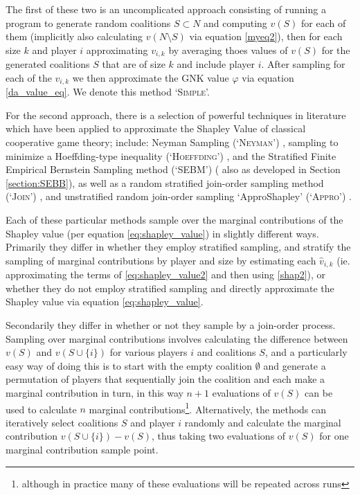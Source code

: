 The first of these two is an uncomplicated approach consisting of running a program to generate random coalitions $S\subset N$ and computing $v(S)$ for each of them (implicitly also calculating $v(N\setminus S)$ via equation \ref{myeq2}), then for each size $k$ and player $i$ approximating $v_{i,k}$ by averaging thoes values of $v(S)$ for the generated coalitions $S$ that are of size $k$ and include player $i$.
After sampling for each of the $v_{i,k}$ we then approximate the GNK value $\varphi$ via equation \ref{da_value_eq}. We denote this method `\textsc{Simple}'.

For the second approach, there is a selection of powerful techniques in literature which have been applied to approximate the Shapley Value of classical cooperative game theory; include: Neyman Sampling (`\textsc{Neyman}') \cite{CASTRO2017180,1938.10503378}, sampling to minimize a Hoeffding-type inequality (`\textsc{Hoeffding}') \cite{2013arXiv1306.4265M}, and the Stratified Finite Empirical Bernstein Sampling method (`SEBM') (\cite{burgess2} also as developed in Section \ref{section:SEBB}), as well as a random stratified join-order sampling method (`\textsc{Join}') \cite{CASTRO2017180}, and unstratified random join-order sampling `ApproShapley' (`\textsc{Appro}') \cite{DBLP:journals/cor/CastroGT09}.

Each of these particular methods sample over the marginal contributions of the Shapley value (per equation \ref{eq:shapley_value}) in slightly different ways.
Primarily they differ in whether they employ stratified sampling, and stratify the sampling of marginal contributions by player and size by estimating each $\hat{v}_{i,k}$ (ie. approximating the terms of \eqref{eq:shapley_value2} and then using \eqref{shap2}), or whether they do not employ stratified sampling and directly approximate the Shapley value via equation \eqref{eq:shapley_value}.

Secondarily they differ in whether or not they sample by a join-order process. Sampling over marginal contributions involves calculating the difference between $v(S)$ and $v(S\cup\{i\})$ for various players $i$ and coalitions $S$, and a particularly easy way of doing this is to start with the empty coalition $\emptyset$ and generate a permutation of players that sequentially join the coalition and each make a marginal contribution in turn, in this way $n+1$ evaluations of $v(S)$ can be used to calculate $n$ marginal contributions\footnote{although in practice many of these evaluations will be repeated across runs}. Alternatively, the methods can iteratively select coalitions $S$ and player $i$ randomly and calculate the marginal contribution $v(S\cup\{i\}) - v(S)$, thus taking two evaluations of $v(S)$ for one marginal contribution sample point.

